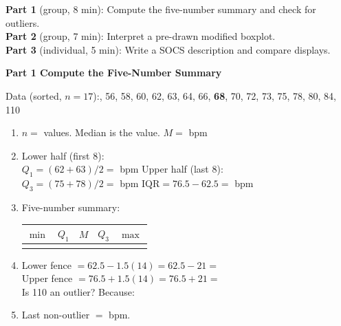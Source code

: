 \documentclass[10pt]{article}
\begin{document}

\vspace{0.10in}

\begin{tcolorbox}[colback=sky, colframe=navy, boxrule=0.8pt, arc=2mm,
    left=3mm, right=3mm, top=2mm, bottom=2mm]
\small
\textbf{Part 1} (group, 8 min): Compute the five-number summary and check for
outliers.\\
\textbf{Part 2} (group, 7 min): Interpret a pre-drawn modified boxplot.\\
\textbf{Part 3} (individual, 5 min): Write a SOCS description and compare displays.
\end{tcolorbox}

\vspace{0.10in}

{\large\bfseries\color{navy} Part 1 \quad Compute the Five-Number Summary}

\vspace{0.08in}

\noindent\small Data (sorted, $n=17$):, 56, 58, 60, 62, 63, 64, 66, \textbf{68}, 70, 72, 73, 75, 78, 80, 84, 110

\vspace{0.10in}

\begin{enumerate}[leftmargin=1.5em, itemsep=6pt]

  \item $n = $  values. Median is the  value. \quad $M = $  bpm

  \item Lower half (first 8): \\[4pt]
        $Q_1 = (62+63)/2 = $  bpm \hfill
        Upper half (last 8): \\[4pt]
        $Q_3 = (75+78)/2 = $  bpm \hfill
        $\text{IQR} = 76.5 - 62.5 = $  bpm

  \item Five-number summary:\\[4pt]
        \renewcommand{\arraystretch}{1.5}
        \begin{tabularx}{0.85\linewidth}{@{} Y Y Y Y Y @{}}
        $\min$ & $Q_1$ & $M$ & $Q_3$ & $\max$ \\
        \midrule
         &  &  &  &  \\
        \end{tabularx}

  \item Lower fence $= 62.5 - 1.5(14) = 62.5 - 21 = $ \\[4pt]
        Upper fence $= 76.5 + 1.5(14) = 76.5 + 21 = $ \\[4pt]
        Is 110 an outlier?  \quad Because: 

  \item Last non-outlier $= $  bpm.

\end{enumerate}
\end{document}
